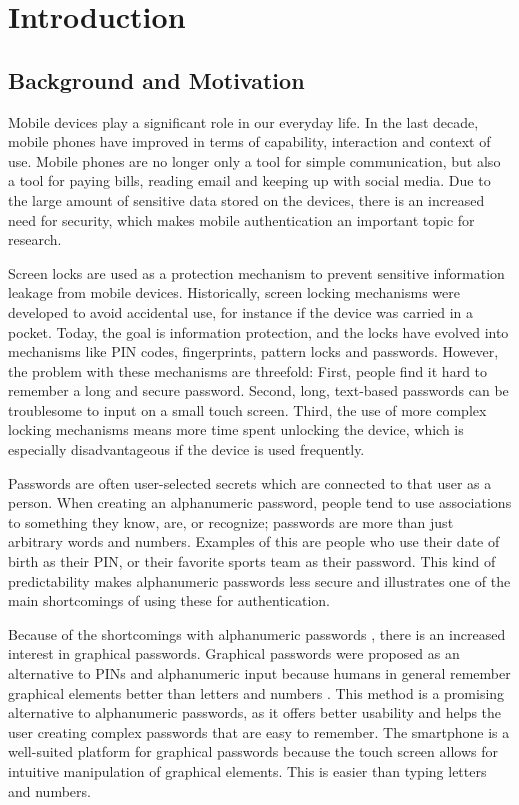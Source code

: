 \chapter{Introduction}\label{chap:introduction}
  
  \clearpage
  \section{Background and Motivation} \label{sec:backgroundandmotivation}
    Mobile devices play a significant role in our everyday life. In the last decade, mobile phones have improved in terms of capability, interaction and context of use. Mobile phones are no longer only a tool for simple communication, but also a tool for paying bills, reading email and keeping up with social media. Due to the large amount of sensitive data stored on the devices, there is an increased need for security, which makes mobile authentication an important topic for research.
    
    Screen locks are used as a protection mechanism to prevent sensitive information leakage from mobile devices. Historically, screen locking mechanisms were developed to avoid accidental use, for instance if the device was carried in a pocket. Today, the goal is information protection, and the locks have evolved into mechanisms like PIN codes, fingerprints, pattern locks and passwords. However, the problem with these mechanisms are threefold: First, people find it hard to remember a long and secure password. Second, long, text-based passwords can be troublesome to input on a small touch screen. Third, the use of more complex locking mechanisms means more time spent unlocking the device, which is especially disadvantageous if the device is used frequently.

    Passwords are often user-selected secrets which are connected to that user as a person. When creating an alphanumeric password, people tend to use associations to something they know, are, or recognize; passwords are more than just arbitrary words and numbers. Examples of this are people who use their date of birth as their PIN, or their favorite sports team as their password. This kind of predictability makes alphanumeric passwords less secure and illustrates one of the main shortcomings of using these for authentication.

    Because of the shortcomings with alphanumeric passwords \cite{UnixPasswords}, there is an increased interest in graphical passwords. Graphical passwords were proposed as an alternative to PINs and alphanumeric input because humans in general remember graphical elements better than letters and numbers \cite{DeAngeli}. This method is a promising alternative to alphanumeric passwords, as it offers better usability and helps the user creating complex passwords that are easy to remember. The smartphone is a well-suited platform for graphical passwords because the touch screen allows for intuitive manipulation of graphical elements. This is easier than typing letters and numbers. 
    
